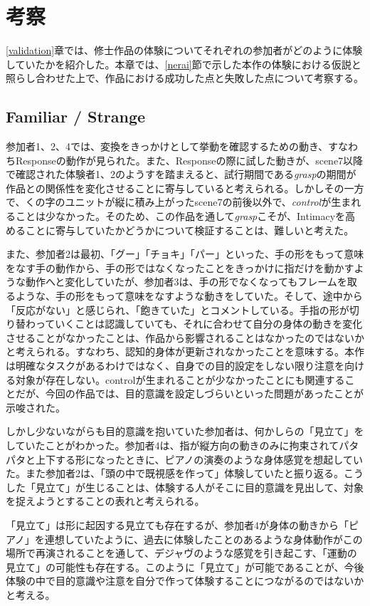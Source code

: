 \chapter{考察}
\label{考察}
\ref{validation}章では、修士作品の体験についてそれぞれの参加者がどのように体験していたかを紹介した。本章では、\ref{nerai}節で示した本作の体験における仮説と照らし合わせた上で、作品における成功した点と失敗した点について考察する。

\section{Familiar / Strange}
参加者1、2、4では、変換をきっかけとして挙動を確認するための動き、すなわちResponseの動作が見られた。また、Responseの際に試した動きが、scene7以降で確認された体験者1、2のようすを踏まえると、試行期間である\textit{grasp}の期間が作品との関係性を変化させることに寄与していると考えられる。しかしその一方で、くの字のユニットが縦に積み上がったscene7の前後以外で、\textit{control}が生まれることは少なかった。そのため、この作品を通して\textit{grasp}こそが、Intimacyを高めることに寄与していたかどうかについて検証することは、難しいと考えた。

また、参加者2は最初、「グー」「チョキ」「パー」といった、手の形をもって意味をなす手の動作から、手の形ではなくなったことをきっかけに指だけを動かすような動作へと変化していたが、参加者3は、手の形でなくなってもフレームを取るような、手の形をもって意味をなすような動きをしていた。そして、途中から「反応がない」と感じられ、「飽きていた」とコメントしている。手指の形が切り替わっていくことは認識していても、それに合わせて自分の身体の動きを変化させることがなかったことは、作品から影響されることはなかったのではないかと考えられる。すなわち、認知的身体が更新されなかったことを意味する。本作は明確なタスクがあるわけではなく、自身での目的設定をしない限り注意を向ける対象が存在しない。controlが生まれることが少なかったことにも関連することだが、今回の作品では、目的意識を設定しづらいといった問題があったことが示唆された。

しかし少ないながらも目的意識を抱いていた参加者は、何かしらの「見立て」をしていたことがわかった。参加者4は、指が縦方向の動きのみに拘束されてパタパタと上下する形になったときに、ピアノの演奏のような身体感覚を想起していた。また参加者2は、「頭の中で既視感を作って」体験していたと振り返る。こうした「見立て」が生じることは、体験する人がそこに目的意識を見出して、対象を捉えようとすることの表れと考えられる。

「見立て」は形に起因する見立ても存在するが、参加者4が身体の動きから「ピアノ」を連想していたように、過去に体験したことのあるような身体動作がこの場所で再演されることを通して、デジャヴのような感覚を引き起こす、「運動の見立て」の可能性も存在する。このように「見立て」が可能であることが、今後体験の中で目的意識や注意を自分で作って体験することにつながるのではないかと考える。

